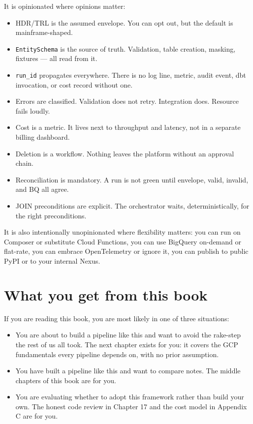 \documentclass[
  11pt,
  british,
  oneside]{book}
\providecommand{\tightlist}{%
  \setlength{\itemsep}{0pt}\setlength{\parskip}{0pt}}
\begin{document}
It is opinionated where opinions matter:

\begin{itemize}
\tightlist
\item
  HDR/TRL is the assumed envelope. You can opt out, but the default is
  mainframe-shaped.
\item
  \texttt{EntitySchema} is the source of truth. Validation, table
  creation, masking, fixtures --- all read from it.
\item
  \texttt{run\_id} propagates everywhere. There is no log line, metric,
  audit event, dbt invocation, or cost record without one.
\item
  Errors are classified. Validation does not retry. Integration does.
  Resource fails loudly.
\item
  Cost is a metric. It lives next to throughput and latency, not in a
  separate billing dashboard.
\item
  Deletion is a workflow. Nothing leaves the platform without an
  approval chain.
\item
  Reconciliation is mandatory. A run is not green until envelope, valid,
  invalid, and BQ all agree.
\item
  JOIN preconditions are explicit. The orchestrator waits,
  deterministically, for the right preconditions.
\end{itemize}

It is also intentionally unopinionated where flexibility matters: you
can run on Composer or substitute Cloud Functions, you can use BigQuery
on-demand or flat-rate, you can embrace OpenTelemetry or ignore it, you
can publish to public PyPI or to your internal Nexus.

\hypertarget{what-you-get-from-this-book}{%
\section{What you get from this
book}\label{what-you-get-from-this-book}}

If you are reading this book, you are most likely in one of three
situations:

\begin{itemize}
\tightlist
\item
  You are about to build a pipeline like this and want to avoid the
  rake-step the rest of us all took. The next chapter exists for you: it
  covers the GCP fundamentals every pipeline depends on, with no prior
  assumption.
\item
  You have built a pipeline like this and want to compare notes. The
  middle chapters of this book are for you.
\item
  You are evaluating whether to adopt this framework rather than build
  your own. The honest code review in Chapter 17 and the cost model in
  Appendix C are for you.
\end{itemize}
\end{document}
